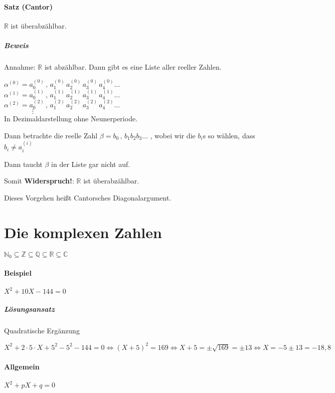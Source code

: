\documentclass[14pt,a4paper]{article}
\newcommand{\N}{\ensuremath{\mathbb{N}}}
\newcommand{\Z}{\ensuremath{\mathbb{Z}}}
\newcommand{\Nzero}{\ensuremath{\N_0}}
\begin{document}
  \paragraph{Satz (Cantor)}
  $\mathbb{R}$ ist überabzählbar.
  \subparagraph{Beweis}
  Annahme: $\mathbb{R}$ ist abzählbar.
  Dann gibt es eine Liste aller reeller Zahlen.

  $ \alpha^{(0)} = a_0^{(0)}\,,\, a_1^{(0)} \, a^{(0)}_2 \, a_3^{(0)} \,
  a_4^{(0)} \ldots \, $ \\
  
  $ \alpha^{(1)} = a_0^{(1)}\,,\, a_1^{(1)} \, a^{(1)}_2 \, a_3^{(1)} \,
  a_4^{(1)} \ldots \, $ \\

  $ \alpha^{(2)} = a_0^{(2)}\,,\, a_1^{(2)} \, a^{(2)}_2 \, a_3^{(2)} \,
  a_4^{(2)} \ldots \, $ \\

  $\quad \quad \quad \quad \vdots$ \\


  In Dezimaldarstellung ohne Neunerperiode.


  Dann betrachte die reelle Zahl $ \beta = b_0 \,,\, b_1 b_2 b_3 \ldots$ , wobei wir
  die $ b_i$s so wählen, dass $ b_i \neq a_i^{(i)}$

  Dann taucht $ \beta $ in der Liste gar nicht auf.

  Somit \textbf{Widerspruch!}: $ \mathbb{R} $ ist überabzählbar.

  Dieses Vorgehen heißt Cantorsches Diagonalargument.
  \section{Die komplexen Zahlen}
  $ \Nzero \subseteq \Z \subseteq \mathbb{Q} \subseteq \mathbb{R} \subseteq \mathbb{C} $

  \paragraph{Beispiel}
  $ X^2 + 10 X - 144 = 0$

  \subparagraph{Lösungsansatz} Quadratische Ergänzung

  $X^2 + 2 \cdot 5 \cdot X + 5^2 - 5^2 - 144 = 0 \Leftrightarrow (X + 5)^2 = 169
  \Leftrightarrow X + 5 = \pm \sqrt{169} = \pm 13 \Leftrightarrow X = -5 \pm 13
  = -18, 8$

  \paragraph{Allgemein}
  $ X^2 + p X + q = 0$
\end{document}
